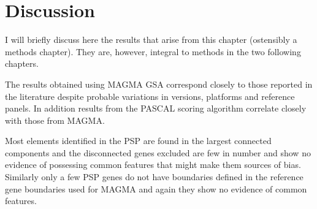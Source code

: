  
 

 
 
 

  


\clearpage


\section{Discussion}
\label{sec:Methods Discussion}

 I will briefly discuss here the results that arise from this chapter (ostensibly a methods chapter). They are, however, integral to methods in the two following chapters. 

The results obtained using MAGMA GSA correspond closely to those reported in the  literature despite probable variations in versions, platforms and reference panels. In addition results from the PASCAL scoring algorithm correlate closely with those from MAGMA. 

Most elements identified in the PSP are found in the largest connected components and the disconnected genes excluded  are few in number and show no evidence of possessing common features that might make them sources of bias. Similarly only a few PSP genes do not have boundaries defined in the reference gene boundaries used for MAGMA and again they show no evidence of common features. 

